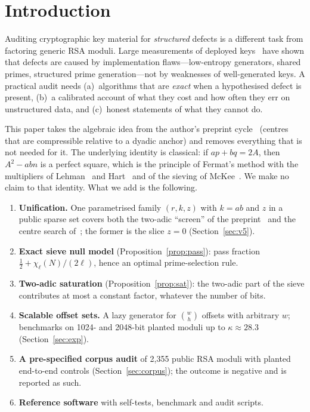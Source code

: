 \documentclass[11pt,a4paper]{article}
\begin{document}
\section{Introduction}
Auditing cryptographic key material for \emph{structured} defects is a different task from factoring generic RSA moduli. Large measurements of deployed keys~\cite{heninger,lenstra,hastings,svenda,nemec} have shown that defects are caused by implementation flaws---low-entropy generators, shared primes, structured prime generation---not by weaknesses of well-generated keys. A practical audit needs (a)~algorithms that are \emph{exact} when a hypothesised defect is present, (b)~a calibrated account of what they cost and how often they err on unstructured data, and (c)~honest statements of what they cannot do.

This paper takes the algebraic idea from the author's preprint cycle~\cite{zenodo10} (centres that are compressible relative to a dyadic anchor) and removes everything that is not needed for it. The underlying identity is classical: if $ap+bq=2A$, then $A^2-abn$ is a perfect square, which is the principle of Fermat's method with the multipliers of Lehman~\cite{lehman} and Hart~\cite{hart} and of the sieving of McKee~\cite{mckee}. We make no claim to that identity. What we add is the following.

\begin{enumerate}[label=\textbf{C\arabic*.},leftmargin=2.2em,itemsep=2pt]
\item \textbf{Unification.} One parametrised family $(r,k,z)$ with $k=ab$ and $z$ in a public sparse set covers both the two-adic ``screen'' of the preprint~\cite{zenodo5} and the centre search of~\cite{zenodo10}; the former is the slice $z=0$ (Section~\ref{sec:v5}).
\item \textbf{Exact sieve null model} (Proposition~\ref{prop:pass}): pass fraction $\tfrac12+\chi_\ell(N)/(2\ell)$, hence an optimal prime-selection rule.
\item \textbf{Two-adic saturation} (Proposition~\ref{prop:sat}): the two-adic part of the sieve contributes at most a constant factor, whatever the number of bits.
\item \textbf{Scalable offset sets.} A lazy generator for $\binom{w}{h}$ offsets with arbitrary $w$; benchmarks on 1024- and 2048-bit planted moduli up to $\kappa\approx 28.3$ (Section~\ref{sec:exp}).
\item \textbf{A pre-specified corpus audit} of 2{,}355 public RSA moduli with planted end-to-end controls (Section~\ref{sec:corpus}); the outcome is negative and is reported as such.
\item \textbf{Reference software} with self-tests, benchmark and audit scripts.
\end{enumerate}
\end{document}

